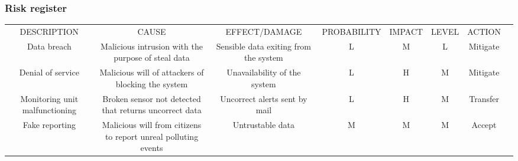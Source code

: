 \subsubsection{Risk register}
\begin{center}
    \begin{tabularx}{\textwidth}{|c|c|c|c|c|c|c|c|}
     DESCRIPTION & CAUSE & EFFECT/DAMAGE & PROBABILITY & IMPACT & LEVEL & ACTION \\ 
     Data breach & Malicious intrusion with the purpose of steal data & Sensible data exiting from the system & L & M & L & Mitigate \\
     Denial of service & Malicious will of attackers of blocking the system & Unavailability of the system & L & H & M & Mitigate \\
     Monitoring unit malfunctioning & Broken sensor not detected that returns uncorrect data & Uncorrect alerts sent by mail & L & H & M & Transfer \\
     Fake reporting & Malicious will from citizens to report unreal polluting events & Untrustable data & M & M & M & Accept \\
    \end{tabularx}
\end{center}